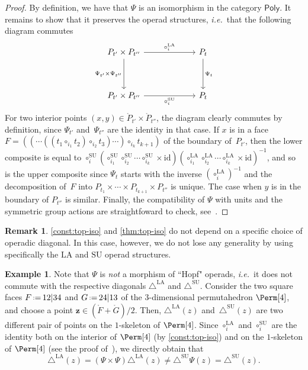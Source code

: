 \documentclass{amsart}
\theoremstyle{definition}
\newtheorem{example}[theorem]{Example}
\newtheorem{remark}[theorem]{Remark}
\renewcommand{\b}[1]{{\boldsymbol{#1}}} %
\newcommand{\eqdef}{\mbox{\,\raisebox{0.2ex}{\scriptsize\ensuremath{\mathrm:}}\ensuremath{=}\,}} %
\newcommand{\ie}{\textit{i.e.}~} %
\renewcommand{\b}[1]{\boldsymbol{#1}} %
\newcommand{\SU}{\mathrm{SU}}
\newcommand{\LA}{\mathrm{LA}}
\newcommand{\SUD}{\triangle^{\mathrm{SU}}}
\newcommand{\LAD}{\triangle^{\mathrm{LA}}}
\newcommand{\PolySub}{\mathsf{Poly}}
\newcommand{\id}{\mathrm{id}}
\begin{document}
\begin{proof}
By definition, we have that $\Psi$ is an isomorphism in the category $\PolySub$. 
It remains to show that it preserves the operad structures, \ie that the following diagram commutes
\[
\vcenter{\hbox{
\begin{tikzcd}[column sep=2.2cm, row sep=1.3cm]
P_{t'}\times P_{t''}
\arrow[r,  "\circ_i^\LA"] 
\arrow[d,  "\Psi_{t'}\times\Psi_{t''}"']
& P_{t} \arrow[d,  "\Psi_t"] \\
P_{t'}\times P_{t''}  
\arrow[r,  "\circ_i^\SU"']
& P_{t}
\end{tikzcd}
}}\]
For two interior points $(x,y) \in \mathring P_{t'}\times \mathring P_{t''}$, the diagram clearly commutes by definition, since $\Psi_{t'}$ and~$\Psi_{t''}$ are the identity in that case. 
If $x$ is in a face $F=((\cdots((t_1 \circ_{i_1} t_2) \circ_{i_2} t_3) \cdots )\circ_{i_k} t_{k+1})$ of the boundary of~$P_{t'}$, then the lower composite is equal to $\circ_i^\SU (\circ_{i_1}^\SU \circ_{i_2}^\SU \cdots \circ_{i_k}^\SU \times \id)(\circ_{i_1}^\LA \circ_{i_2}^\LA \cdots \circ_{i_k}^\LA \times \id)^{-1}$, and so is the upper composite since $\Psi_t$ starts with the inverse $(\circ_i^\LA)^{-1}$ and the decomposition of~$F$ into $P_{t_1} \times \cdots \times P_{t_{k+1}} \times P_{t''}$ is unique.
The case when $y$ is in the boundary of $P_{t''}$ is similar.  
Finally, the compatibility of $\Psi$ with units and the symmetric group actions are straightfoward to check, see~\cite[Def.~4.17 \& Thm.~4.18]{LaplanteAnfossi}.
\end{proof}

\begin{remark}
\cref{const:top-iso} and \cref{thm:top-iso} do not depend on a specific choice of operadic diagonal.
In this case, however, we do not lose any generality by using specifically the $\LA$ and $\SU$ operad structures. 
\end{remark}

\begin{example}
\label{ex:iso-not-Hopf}
Note that $\Psi$ is \emph{not} a morphism of ``Hopf" operads, \ie it does not commute with the respective diagonals $\LAD$ and $\SUD$. 
Consider the two square faces $F \eqdef 12|34$ and $G \eqdef 24|13$ of the $3$-dimensional permutahedron $\Perm[4]$, and choose a point $\b z \in (\mathring F + \mathring G)/2$.
Then, $\LAD(z)$ and~$\SUD(z)$ are two different pair of points on the $1$-skeleton of $\Perm[4]$. 
Since $\circ_i^\LA$ and $\circ_i^\SU$ are the identity both on the interior of $\Perm[4]$ (by \cref{const:top-iso}) and on the $1$-skeleton of $\Perm[4]$ (see the proof of~\cite[Prop. 7]{MasudaThomasTonksVallette}), we directly obtain that
\[
{\LAD(z)=(\Psi \times \Psi)\LAD(z) \neq \SUD \Psi(z)=\SUD(z)}.
\] 
\end{example}
\end{document}
